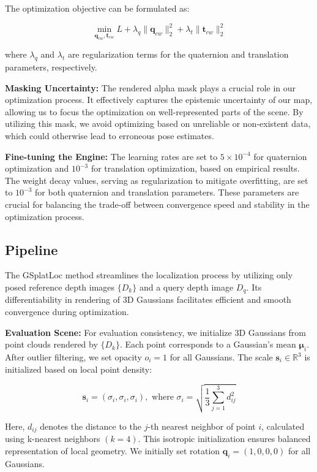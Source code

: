 \documentclass[twocolumn]{article} %
\begin{document}
The optimization objective can be formulated as:

\[
\min_{\mathbf{q}_{cw}, \mathbf{t}_{cw}} L + \lambda_q \|\mathbf{q}_{cw}\|_2^2 + \lambda_t \|\mathbf{t}_{cw}\|_2^2
\]

where \(\lambda_q\) and \(\lambda_t\) are regularization terms for the
quaternion and translation parameters, respectively.

\textbf{Masking Uncertainty:} The rendered alpha mask plays a crucial
role in our optimization process. It effectively captures the epistemic
uncertainty of our map, allowing us to focus the optimization on
well-represented parts of the scene. By utilizing this mask, we avoid
optimizing based on unreliable or non-existent data, which could
otherwise lead to erroneous pose estimates.

\textbf{Fine-tuning the Engine:} The learning rates are set to
\(5 \times 10^{-4}\) for quaternion optimization and \(10^{-3}\) for
translation optimization, based on empirical results. The weight decay
values, serving as regularization to mitigate overfitting, are set to
\(10^{-3}\) for both quaternion and translation parameters. These
parameters are crucial for balancing the trade-off between convergence
speed and stability in the optimization process.

\subsection{Pipeline}\label{pipeline}

The GSplatLoc method streamlines the localization process by utilizing
only posed reference depth images \(\{D_k\}\) and a query depth image
\(D_q\). Its differentiability in rendering of 3D Gaussians facilitates
efficient and smooth convergence during optimization.

\textbf{Evaluation Scene:} For evaluation consistency, we initialize 3D
Gaussians from point clouds rendered by \(\{D_k\}\). Each point
corresponds to a Gaussian's mean \(\boldsymbol{\mu}_i\). After outlier
filtering, we set opacity \(o_i = 1\) for all Gaussians. The scale
\(\mathbf{s}_i \in \mathbb{R}^3\) is initialized based on local point
density:

\[\mathbf{s}_i = (\sigma_i, \sigma_i, \sigma_i), \text{ where } \sigma_i = \sqrt{\frac{1}{3}\sum_{j=1}^3 d_{ij}^2}\]

Here, \(d_{ij}\) denotes the distance to the \(j\)-th nearest neighbor
of point \(i\), calculated using k-nearest neighbors \((k=4)\). This
isotropic initialization ensures balanced representation of local
geometry. We initially set rotation \(\mathbf{q}_i = (1, 0, 0, 0)\) for
all Gaussians.
\end{document}
